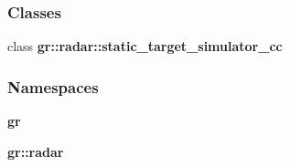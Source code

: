 \subsubsection*{Classes}
\begin{DoxyCompactItemize}
\item 
class {\bf gr\+::radar\+::static\+\_\+target\+\_\+simulator\+\_\+cc}
\end{DoxyCompactItemize}
\subsubsection*{Namespaces}
\begin{DoxyCompactItemize}
\item 
 {\bf gr}
\item 
 {\bf gr\+::radar}
\end{DoxyCompactItemize}
